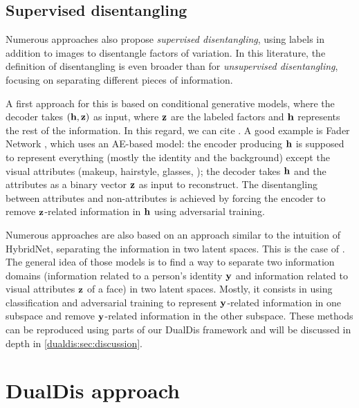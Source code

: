 \subsection{Supervised disentangling}

Numerous approaches also propose \textit{supervised disentangling}, using labels in addition to images to disentangle factors of variation. In this literature, the definition of disentangling is even broader than for \textit{unsupervised disentangling}, focusing on separating different pieces of information.

A first approach for this is based on conditional generative models, where the decoder takes $(\mathbf{h}, \mathbf{z})$ as input, where $\mathbf{z}$ are the labeled factors and $\mathbf{h}$ represents the rest of the information. In this regard, we can cite \citet{perarnau2016invertible,Tran2017,Liu2018}. A good example is Fader Network \citep{Lample2017}, which uses an \acs{AE}-based model: the encoder producing $\mathbf{h}$ is supposed to represent everything (mostly the identity and the background) except the visual attributes (makeup, hairstyle, glasses, \etc); the decoder takes $\mathbf{h}$ and the attributes as a binary vector $\mathbf{z}$ as input to reconstruct. The disentangling between attributes and non-attributes is achieved by forcing the encoder to remove $\mathbf{z}$-related information in $\mathbf{h}$ using adversarial training.

Numerous approaches are also based on an approach similar to the intuition of HybridNet, separating the information in two latent spaces. This is the case of \citet{Mathieu2016,peng2017reconstruction,Klys2018,Hadad2018,Jaiswal2018,Liu2018a}. The general idea of those models is to find a way to separate two information domains (\eg information related to a person's identity $\mathbf{y}$ and information related to visual attributes $\mathbf{z}$ of a face) in two latent spaces. Mostly, it consists in using classification and adversarial training to represent $\mathbf{y}$-related information in one subspace and remove $\mathbf{y}$-related information in the other subspace. These methods can be reproduced using parts of our DualDis framework and will be discussed in depth in \autoref{dualdis:sec:discussion}.


\section{DualDis approach} \label{dualdis:sec:model}

